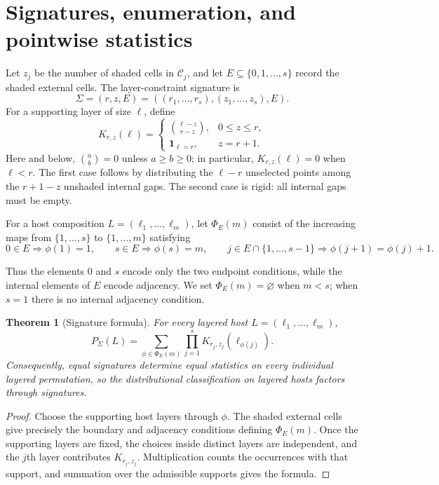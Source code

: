 \documentclass[12pt]{article}
\newtheorem{thm}{Theorem}[section]
\begin{document}
\section{Signatures, enumeration, and pointwise statistics}\label{sec:signature} 

Let $z_j$ be the number of shaded cells in $\mathcal C_j$, and let
$E\subseteq\{0,1,\ldots,s\}$ record the shaded external cells.  The
layer-constraint signature is
\[
\Sigma=(r,z,E)=((r_1,\ldots,r_s),(z_1,\ldots,z_s),E).
\]
For a supporting layer of size $\ell$, define
\[
K_{r,z}(\ell)=
\begin{cases}
\displaystyle\binom{\ell-z}{r-z},&0\le z\le r,\\[2mm]
\mathbf1_{\ell=r},&z=r+1.
\end{cases}
\]
Here and below, $\binom ab=0$ unless $a\ge b\ge0$; in particular,
$K_{r,z}(\ell)=0$ when $\ell<r$.
The first case follows by distributing the $\ell-r$ unselected points among
the $r+1-z$ unshaded internal gaps.  The second case is rigid: all internal
gaps must be empty.

For a host composition $L=(\ell_1,\ldots,\ell_m)$, let $\Phi_E(m)$ consist of
the increasing maps from $\{1,\ldots,s\}$ to $\{1,\ldots,m\}$ satisfying
\[
0\in E\Rightarrow\phi(1)=1,
\qquad s\in E\Rightarrow\phi(s)=m,
\qquad j\in E\cap\{1,\ldots,s-1\}
\Rightarrow\phi(j+1)=\phi(j)+1.
\]

Thus the elements $0$ and $s$ encode only the two endpoint conditions, while
the internal elements of $E$ encode adjacency.  We set $\Phi_E(m)=\varnothing$
when $m<s$; when $s=1$ there is no internal adjacency condition.

\begin{thm}[Signature formula]\label{thm:signature}
For every layered host $L=(\ell_1,\ldots,\ell_m)$,
\[
P_\Sigma(L)=
\sum_{\phi\in\Phi_E(m)}
\prod_{j=1}^sK_{r_j,z_j}(\ell_{\phi(j)}).
\]
Consequently, equal signatures determine equal statistics on every
individual layered permutation, so the distributional classification on
layered hosts factors through signatures.
\end{thm}

\begin{proof}
Choose the supporting host layers through $\phi$.  The shaded external cells
give precisely the boundary and adjacency conditions defining $\Phi_E(m)$.
Once the supporting layers are fixed, the choices inside distinct layers are
independent, and the $j$th layer contributes $K_{r_j,z_j}$.  Multiplication
counts the occurrences with that support, and summation over the admissible
supports gives the formula.
\end{proof}
\end{document}
